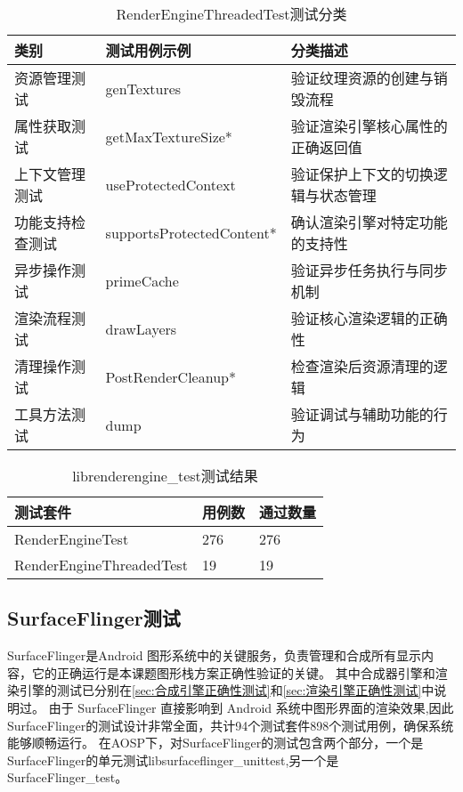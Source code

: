 \begin{table}[H]
    \centering
    \caption{RenderEngineThreadedTest测试分类}
    \label{tab:RenderEngineThreadedTest测试分类}
    \begin{tabular}{lll}
      \toprule
      类别 & 测试用例示例 & 分类描述 \\
      \midrule
      资源管理测试 & genTextures & 验证纹理资源的创建与销毁流程 \\
      属性获取测试 & getMaxTextureSize* & 验证渲染引擎核心属性的正确返回值 \\
      上下文管理测试 & useProtectedContext & 验证保护上下文的切换逻辑与状态管理 \\
      功能支持检查测试 & supportsProtectedContent* & 确认渲染引擎对特定功能的支持性 \\
      异步操作测试 & primeCache & 验证异步任务执行与同步机制 \\
      渲染流程测试 & drawLayers & 验证核心渲染逻辑的正确性 \\
      清理操作测试 & PostRenderCleanup* & 检查渲染后资源清理的逻辑 \\
      工具方法测试 & dump & 验证调试与辅助功能的行为 \\
      \bottomrule
    \end{tabular}
    \note{}
\end{table}

\begin{table}[H]
    \centering
    \caption{librenderengine\_test测试结果}
    \label{tab:librenderengine_test测试结果}
    \begin{tabular}{lll}
      \toprule
      测试套件 & 用例数 & 通过数量 \\
      \midrule
      RenderEngineTest & 276 & 276 \\
      RenderEngineThreadedTest & 19 & 19 \\
      \bottomrule
    \end{tabular}
    \note{}
\end{table}

\subsection{SurfaceFlinger测试}
SurfaceFlinger是Android 图形系统中的关键服务，负责管理和合成所有显示内容，它的正确运行是本课题图形栈方案正确性验证的关键。
其中合成器引擎和渲染引擎的测试已分别在\ref{sec:合成引擎正确性测试}和\ref{sec:渲染引擎正确性测试}中说明过。
由于 SurfaceFlinger 直接影响到 Android 系统中图形界面的渲染效果,因此SurfaceFlinger的测试设计非常全面，共计94个测试套件898个测试用例，确保系统能够顺畅运行。
在AOSP下，对SurfaceFlinger的测试包含两个部分，一个是SurfaceFlinger的单元测试libsurfaceflinger\_unittest,另一个是SurfaceFlinger\_test。

